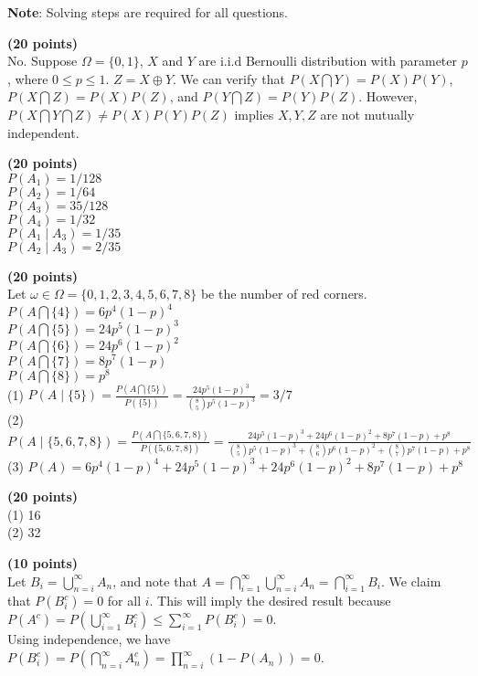\documentclass{homework}
\begin{document}
\maketitle
\textbf{Note}: Solving steps are required for all questions.

\question %
\textbf{(20 points)}\\
No. Suppose $\Omega=\{0,1\}$, $X$ and $Y$ are i.i.d Bernoulli distribution with parameter $p$, where $0\leq p \leq 1$. $Z=X \oplus Y$. We can verify that
$P(X \bigcap Y)=P(X)P(Y)$,
$P(X \bigcap Z)=P(X)P(Z)$, and
$P(Y \bigcap Z)=P(Y)P(Z).$ However, 
$P(X \bigcap Y \bigcap Z) \neq P(X)P(Y)P(Z)$ implies $X, Y, Z$ are not mutually independent.

\question %
\textbf{(20 points)}\\
$P(A_{1})=1/128$\\
$P(A_{2})=1/64$\\
$P(A_{3})=35/128$\\
$P(A_{4})=1/32$\\
$P(A_{1}\mid A_{3}) = 1/35$\\
$P(A_{2} \mid A_{3})=2/35$

\question %
\textbf{(20 points)}\\
Let $\omega \in \Omega=\{0, 1, 2, 3, 4, 5,6,7,8\}$ be the number of red corners.\\
$P(A\bigcap \{4\})=6p^{4}(1-p)^{4}$\\
$P(A\bigcap \{5\})=24p^{5}(1-p)^{3}$\\
$P(A\bigcap \{6\})=24p^{6}(1-p)^{2}$\\
$P(A\bigcap \{7\})=8p^{7}(1-p)$\\
$P(A\bigcap \{8\})=p^{8}$\\
(1) $P(A \mid \{5\})= \frac{P(A \bigcap \{5\})}{P(\{5\})}=\frac{24p^{5}(1-p)^{3}}{\binom{8}{5}p^{5}(1-p)^{3}}=3/7$\\
(2) $P(A \mid \{5,6,7,8\})=\frac{P(A\bigcap\{5,6,7,8\})}{P(\{5,6,7,8\})}=\frac{24p^{5}(1-p)^{3}+24p^{6}(1-p)^{2}+8p^{7}(1-p)+p^{8}}{\binom{8}{5}p^{5}(1-p)^{3}+\binom{8}{6}p^{6}(1-p)^{2}+\binom{8}{7}p^{7}(1-p)+p^{8}}$\\
(3) $P(A)=6p^{4}(1-p)^{4}+24p^{5}(1-p)^{3}+24p^{6}(1-p)^{2}+8p^{7}(1-p)+p^{8}$

\question %
\textbf{(20 points)}\\
(1) 16 \\
(2) 32


\question%
\textbf{(10 points)}\\
Let $B_{i}=\bigcup_{n=i}^{\infty}A_{n}$, and note that $A=\bigcap_{i=1}^{\infty}\bigcup_{n=i}^{\infty}A_{n}=\bigcap_{i=1}^{\infty}B_{i}$. We claim that $P(B_{i}^{c})=0$ for all $i$. This will imply the desired result because $P(A^{c})=P(\bigcup_{i=1}^{\infty}B_{i}^{c})\le \sum_{i=1}^{\infty}P(B_{i}^{c})=0$. \\
Using independence, we have \\
$P(B_{i}^{c})=P(\bigcap_{n=i}^{\infty}A_{n}^{c})=\prod_{n=i}^{\infty}(1-P(A_{n})) =0$.
\end{document}
